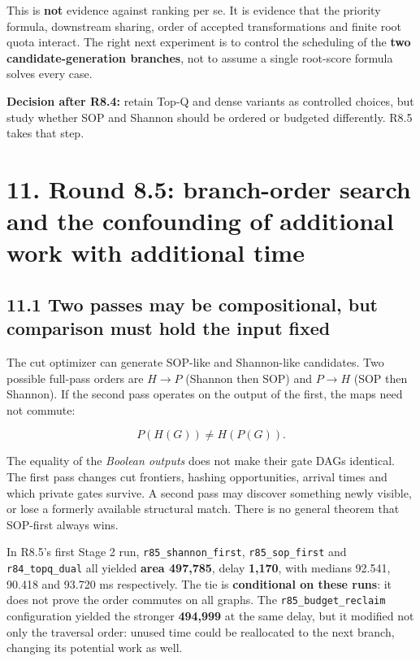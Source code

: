 \documentclass[a4paper,10pt]{article}
\theoremstyle{definition}
\theoremstyle{remark}
\begin{document}
This is \textbf{not} evidence against ranking per se. It is evidence that the priority formula, downstream sharing, order of accepted transformations and finite root quota interact. The right next experiment is to control the scheduling of the \textbf{two candidate-generation branches}, not to assume a single root-score formula solves every case.

\begin{tcolorbox}[colback=ResearchBlue!6!white,colframe=ResearchSlate!55!white,boxrule=0.65pt,arc=1mm,breakable]
\textbf{Decision after R8.4:} retain Top-Q and dense variants as controlled choices, but study whether SOP and Shannon should be ordered or budgeted differently. R8.5 takes that step.
\end{tcolorbox}

\section{11. Round 8.5: branch-order search and the confounding of additional work with additional time}\label{round-8.5-branch-order-search-and-the-confounding-of-additional-work-with-additional-time}

\subsection{11.1 Two passes may be compositional, but comparison must hold the input fixed}\label{two-passes-may-be-compositional-but-comparison-must-hold-the-input-fixed}

The cut optimizer can generate SOP-like and Shannon-like candidates. Two possible full-pass orders are \(H\rightarrow P\) (Shannon then SOP) and \(P\rightarrow H\) (SOP then Shannon). If the second pass operates on the output of the first, the maps need not commute:

\[
P(H(G))\ne H(P(G)).
\]

The equality of the \emph{Boolean outputs} does not make their gate DAGs identical. The first pass changes cut frontiers, hashing opportunities, arrival times and which private gates survive. A second pass may discover something newly visible, or lose a formerly available structural match. There is no general theorem that SOP-first always wins.

In R8.5's first Stage 2 run, \texttt{r85\_shannon\_first}, \texttt{r85\_sop\_first} and \texttt{r84\_topq\_dual} all yielded \textbf{area 497,785}, delay \textbf{1,170}, with medians 92.541, 90.418 and 93.720 ms respectively. The tie is \textbf{conditional on these runs}: it does not prove the order commutes on all graphs. The \texttt{r85\_budget\_reclaim} configuration yielded the stronger \textbf{494,999} at the same delay, but it modified not only the traversal order: unused time could be reallocated to the next branch, changing its potential work as well.
\end{document}
